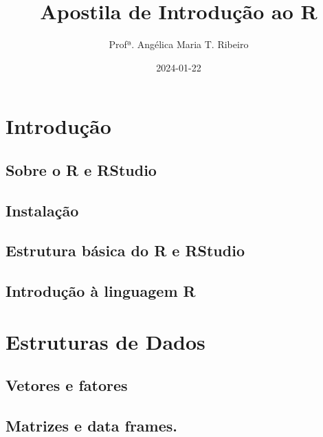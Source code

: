 \documentclass[
]{book}
\title{Apostila de Introdução ao R}
\author{Profª. Angélica Maria T. Ribeiro}
\date{2024-01-22}
\begin{document}
\maketitle

{
\setcounter{tocdepth}{1}
\tableofcontents
}
\hypertarget{introduuxe7uxe3o}{%
\chapter{Introdução}\label{introduuxe7uxe3o}}

\hypertarget{sobre-o-r-e-rstudio}{%
\section{Sobre o R e RStudio}\label{sobre-o-r-e-rstudio}}

\hypertarget{instalauxe7uxe3o}{%
\section{Instalação}\label{instalauxe7uxe3o}}

\hypertarget{estrutura-buxe1sica-do-r-e-rstudio}{%
\section{Estrutura básica do R e RStudio}\label{estrutura-buxe1sica-do-r-e-rstudio}}

\hypertarget{introduuxe7uxe3o-uxe0-linguagem-r}{%
\section{Introdução à linguagem R}\label{introduuxe7uxe3o-uxe0-linguagem-r}}

\hypertarget{estruturas-de-dados}{%
\chapter{Estruturas de Dados}\label{estruturas-de-dados}}

\hypertarget{vetores-e-fatores}{%
\section{Vetores e fatores}\label{vetores-e-fatores}}

\hypertarget{matrizes-e-data-frames.}{%
\section{Matrizes e data frames.}\label{matrizes-e-data-frames.}}
\end{document}
